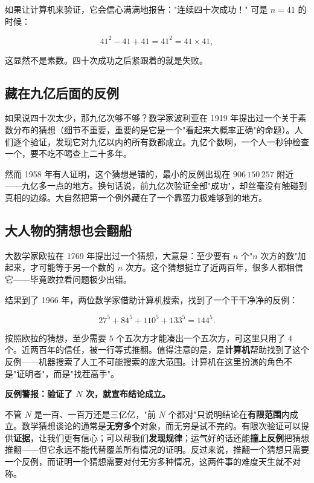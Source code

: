 如果让计算机来验证，它会信心满满地报告："连续四十次成功！" 可是 $n=41$ 的时候：

\[41^2 - 41 + 41 = 41^2 = 41 \times 41,\]

这显然不是素数。四十次成功之后紧跟着的就是失败。

\subsection{藏在九亿后面的反例}

如果说四十次太少，那九亿次够不够？数学家波利亚在 1919 年提出过一个关于素数分布的猜想（细节不重要，重要的是它是一个"看起来大概率正确"的命题）。人们逐个验证，发现它对九亿以内的所有数都成立。九亿个数啊，一个人一秒钟检查一个，要不吃不喝查上二十多年。

然而 1958 年有人证明，这个猜想是错的，最小的反例出现在 $906\,150\,257$ 附近——九亿多一点的地方。换句话说，前九亿次验证全部"成功"，却丝毫没有触碰到真相的边缘。大自然把第一个例外藏在了一个靠蛮力极难够到的地方。

\subsection{大人物的猜想也会翻船}

大数学家欧拉在 1769 年提出过一个猜想，大意是：至少要有 $n$ 个"$n$ 次方的数"加起来，才可能等于另一个数的 $n$ 次方。这个猜想挺立了近两百年，很多人都相信它——毕竟欧拉看问题极少出错。

结果到了 1966 年，两位数学家借助计算机搜索，找到了一个干干净净的反例：

\[27^5 + 84^5 + 110^5 + 133^5 = 144^5.\]

按照欧拉的猜想，至少需要 $5$ 个五次方才能凑出一个五次方，可这里只用了 $4$ 个。近两百年的信任，被一行等式推翻。值得注意的是，是\textbf{计算机}帮助找到了这个反例——机器搜索了人工不可能搜索的庞大范围。计算机在这里扮演的角色不是"证明者"，而是"找茬高手"。

\begin{fanli}
\textbf{反例警报：验证了 $N$ 次，就宣布结论成立。}

不管 $N$ 是一百、一百万还是三亿亿，"前 $N$ 个都对"只说明结论在\textbf{有限范围}内成立。数学猜想谈论的通常是\textbf{无穷多个}对象，而无穷是试不完的。有限次验证可以提供\textbf{证据}，让我们更有信心；可以帮我们\textbf{发现规律}；运气好的话还能\textbf{撞上反例}把猜想推翻——但它永远不能代替覆盖所有情况的证明。反过来说，推翻一个猜想只需要一个反例，而证明一个猜想需要对付无穷多种情况，这两件事的难度天生就不对称。
\end{fanli}

